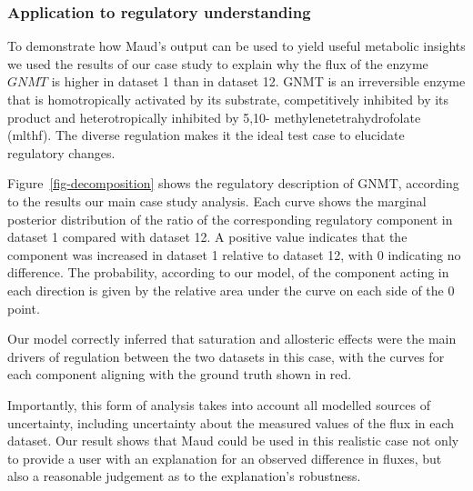 \documentclass[journal=asbcd6,manuscript=article,layout=traditional]{achemso}
\begin{document}
\hypertarget{application-to-regulatory-understanding}{%
\subsubsection{Application to regulatory
understanding}\label{application-to-regulatory-understanding}}

To demonstrate how Maud's output can be used to yield useful metabolic
insights we used the results of our case study to explain why the flux
of the enzyme \(GNMT\) is higher in dataset 1 than in dataset 12. GNMT
is an irreversible enzyme that is homotropically activated by its
substrate, competitively inhibited by its product and heterotropically
inhibited by 5,10- methylenetetrahydrofolate (mlthf). The diverse
regulation makes it the ideal test case to elucidate regulatory changes.

Figure~\ref{fig-decomposition} shows the regulatory description of GNMT,
according to the results our main case study analysis. Each curve shows
the marginal posterior distribution of the ratio of the corresponding
regulatory component in dataset 1 compared with dataset 12. A positive
value indicates that the component was increased in dataset 1 relative
to dataset 12, with 0 indicating no difference. The probability,
according to our model, of the component acting in each direction is
given by the relative area under the curve on each side of the 0 point.

Our model correctly inferred that saturation and allosteric effects were
the main drivers of regulation between the two datasets in this case,
with the curves for each component aligning with the ground truth shown
in red.

Importantly, this form of analysis takes into account all modelled
sources of uncertainty, including uncertainty about the measured values
of the flux in each dataset. Our result shows that Maud could be used in
this realistic case not only to provide a user with an explanation for
an observed difference in fluxes, but also a reasonable judgement as to
the explanation's robustness.
\end{document}
